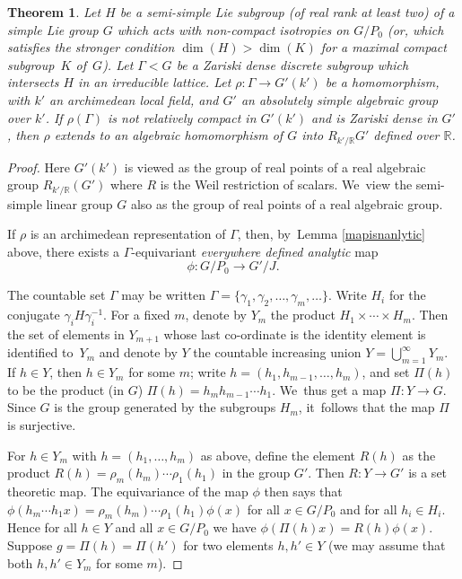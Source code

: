 \documentclass[JEP,XML,SOM,Unicode,published]{cedram}
\newtheorem{theorem}{Theorem}
\theoremstyle{definition}
\newcommand{\field}[1]{\mathbb{#1}}
\newcommand{\R}{\field{R}}
\let\g\gamma
\let\G\Gamma
\begin{document}
\begin{theorem} \label{arch} Let $H$ be a semi-simple Lie subgroup (of
real rank at least two) of a simple Lie group $G$ which acts with
non-compact isotropies on $G/P_0$ (or, which satisfies the stronger
condition $\dim (H)> \dim(K)$ for a maximal compact subgroup~$K$ of~$G$).
Let $\Gamma <G$ be a Zariski dense discrete subgroup which
intersects $H$
in an irreducible lattice. Let $\rho: \Gamma \to G'(k')$ be a
homomorphism, with $k'$ an archimedean local field, and
$G'$ an absolutely simple algebraic group over $k'$. If $\rho (\Gamma
)$ is not relatively compact in $G'(k')$ and is Zariski dense in $G'$,
then $\rho $ extends to an algebraic homomorphism of $G$ into $R_{k'/\R}G'$
defined over $\R$.
\end{theorem}

\begin{proof} Here $G'(k')$ is viewed as the group of real points of a real algebraic group $R_{k'/\R}(G')$ where $R$ is the Weil restriction of scalars. We~view the semi-simple linear group $G$ also as the group of real points of a real algebraic group.

If $\rho$ is an archimedean representation of $\Gamma $,
then, by~Lemma \ref{mapisnanlytic} above, there exists a $\Gamma$-equivariant \emph{everywhere defined analytic} map
\[
\phi: G/{P_0} \to G'/J.
\]

The countable set $\G$ may be written $\G=\{\g_1, \g_2,\dots,\g_m,\dots \}$. Write $H_i$ for the conjugate $\g_i H \g_i^{-1}$. For a fixed $m$, denote by $Y_m$ the product $H_1\times \cdots\times H_m$. Then the set of elements in $Y_{m+1}$ whose last co-ordinate is the identity element is identified to~$Y_m$ and denote by $Y$ the countable increasing union $Y=\bigcup_{m=1}^{\infty} Y_m$. If $h\in Y$, then $h\in Y_m$ for some $m$; write $h=(h_1,h_{m-1},\dots,h_m)$, and set $\Pi(h)$ to be the product (in $G$) $\Pi (h)=h_mh_{m-1}\cdots h_1$. We~thus get a map $\Pi : Y \to G$. Since $G$ is the group generated by the subgroups $H_m$, it~follows that the map $\Pi$ is surjective.

For $h\in Y_m$ with $h=(h_1,\dots, h_m)$ as above, define the element $R(h)$ as the product $R(h)=\rho_m(h_m)\cdots \rho_1(h_1)$ in the group $G'$. Then $R: Y \to G'$ is a set theoretic map. The equivariance of the map $\phi $ then says that $\phi (h_m\cdots h_1x)= \rho_m(h_m)\cdots \rho_1(h_1)\phi (x)$ for all $x\in G/P_0$ and for all $h_i\in H_i$. Hence for all $h\in Y$ and all $x\in G/P_0$ we have $\phi (\Pi (h)x)=R(h)\phi (x)$. Suppose $g=\Pi (h)=\Pi (h')$ for two elements $h,h' \in Y$ (we may assume that both $h,h' \in Y_m$ for some $m$).


\end{proof}
\end{document}
